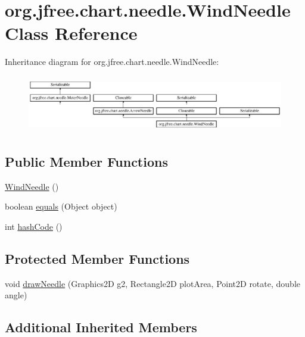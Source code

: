 \hypertarget{classorg_1_1jfree_1_1chart_1_1needle_1_1_wind_needle}{}\section{org.\+jfree.\+chart.\+needle.\+Wind\+Needle Class Reference}
\label{classorg_1_1jfree_1_1chart_1_1needle_1_1_wind_needle}
Inheritance diagram for org.\+jfree.\+chart.\+needle.\+Wind\+Needle\+:\begin{figure}[H]
\begin{center}
\leavevmode
\includegraphics[height=2.511211cm]{classorg_1_1jfree_1_1chart_1_1needle_1_1_wind_needle}
\end{center}
\end{figure}
\subsection*{Public Member Functions}
\begin{DoxyCompactItemize}
\item 
\mbox{\hyperlink{classorg_1_1jfree_1_1chart_1_1needle_1_1_wind_needle_a04c05956646ec68c2f14ec88cd199935}{Wind\+Needle}} ()
\item 
boolean \mbox{\hyperlink{classorg_1_1jfree_1_1chart_1_1needle_1_1_wind_needle_a9f4c4f652dc19a82ef9c0bf71cf524ca}{equals}} (Object object)
\item 
int \mbox{\hyperlink{classorg_1_1jfree_1_1chart_1_1needle_1_1_wind_needle_a75b25d409f1ef956f16d069aba4df475}{hash\+Code}} ()
\end{DoxyCompactItemize}
\subsection*{Protected Member Functions}
\begin{DoxyCompactItemize}
\item 
void \mbox{\hyperlink{classorg_1_1jfree_1_1chart_1_1needle_1_1_wind_needle_a774719997f25e69dd042dd48d2f4e8db}{draw\+Needle}} (Graphics2D g2, Rectangle2D plot\+Area, Point2D rotate, double angle)
\end{DoxyCompactItemize}
\subsection*{Additional Inherited Members}


